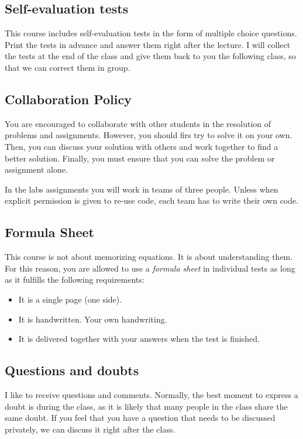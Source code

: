 \subsection{Self-evaluation tests}

This course includes self-evaluation tests in the form of multiple choice questions.
Print the tests in advance and answer them right after the lecture.
I will collect the tests at the end of the class and give them back to you the following class, so that we can correct them in group.

\subsection{Collaboration Policy}
You are encouraged to collaborate with other students in the resolution of problems and assignments.
However, you should firs try to solve it on your own.
Then, you can discuss your solution with others and work together to find a better solution.
Finally, you must ensure that you can solve the problem or assignment alone.

In the labs assignments you will work in teams of three people.
Unless when explicit permission is given to re-use code, each team has to write their own code.

\subsection{Formula Sheet}
This course is not about memorizing equations.
It is about understanding them.
For this reason, you are allowed to use a \emph{formula sheet} in individual tests as long as it fulfills the following requirements:
\begin{itemize}
\item It is a single page (one side).
\item It is handwritten. Your own handwriting.
\item It is delivered together with your answers when the test is finished.
\end{itemize}

\subsection{Questions and doubts}
I like to receive questions and comments.
Normally, the best moment to express a doubt is during the class, as it is likely that many people in the class share the same doubt.
If you feel that you have a question that needs to be discussed privately, we can discuss it right after the class.

